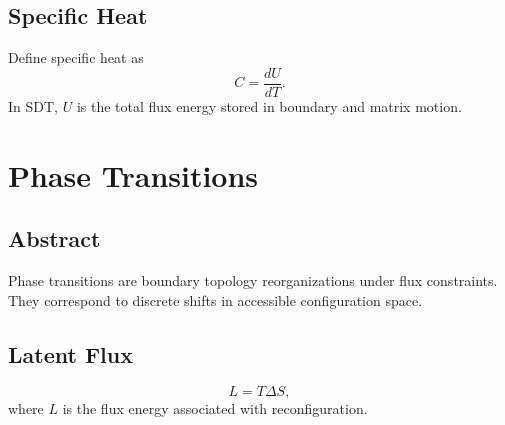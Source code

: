 \documentclass[12pt]{book}
\begin{document}
\section{Specific Heat}
Define specific heat as
\begin{equation}
C = \frac{dU}{dT}.
\end{equation}
In SDT, $U$ is the total flux energy stored in boundary and matrix motion.

\chapter{Phase Transitions}

\section*{Abstract}
Phase transitions are boundary topology reorganizations under flux constraints. They correspond to
discrete shifts in accessible configuration space.

\section{Latent Flux}
\begin{equation}
L = T \Delta S,
\end{equation}
where $L$ is the flux energy associated with reconfiguration.
\end{document}
